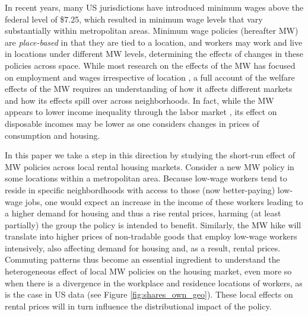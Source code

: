 

In recent years, many US jurisdictions have introduced minimum wages above the 
federal level of \$7.25, which resulted in minimum wage levels that vary 
substantially within metropolitan areas.
Minimum wage policies (hereafter MW) are \textit{place-based} in that they are 
tied to a location, and workers may work and live in locations under different 
MW levels, determining the effects of changes in these policies across space.
While most research on the effects of the MW has focused on employment and wages 
irrespective of location 
\parencite[e.g.,][]{CardKrueger1994, CegnizEtAl2019}, 
a full account of the welfare effects of the MW requires an understanding of 
how it affects different markets and how its effects spill over across 
neighborhoods.
In fact, while the MW appears to lower income inequality through the labor 
market \parencite{Lee1999, AutorEtAl2016},
its effect on disposable incomes may be lower as one considers changes in prices
of consumption and housing.

In this paper we take a step in this direction by studying the short-run effect 
of MW policies across local rental housing markets.
Consider a new MW policy in some locations within a metropolitan area.
Because low-wage workers tend to reside in specific neighbordhoods with access 
to those (now better-paying) low-wage jobs,
one would expect an increase in the income of these workers leading to a higher 
demand for housing and thus a rise rental prices, 
harming (at least partially) the group the policy is intended to benefit.
Similarly, the MW hike will translate into higher prices of non-tradable goods 
that employ low-wage workers intensively, also affecting demand for housing and, 
as a result, rental prices.
Commuting patterns thus become an essential ingredient to understand the 
heterogeneous effect of local MW policies on the housing market, even more so
when there is a divergence in the workplace and residence locations of workers, 
as is the case in US data (see Figure \ref{fig:shares_own_geo}).
These local effects on rental prices will in turn influence the distributional
impact of the policy.

